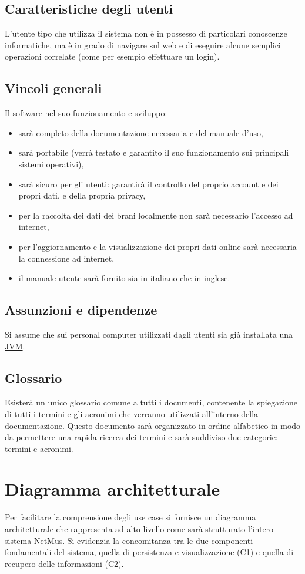 \section{Caratteristiche degli utenti}
L'utente tipo che utilizza il sistema non \`e in possesso di particolari
conoscenze informatiche, ma \`e in grado di navigare sul web e di eseguire alcune
semplici operazioni correlate (come per esempio effettuare un login).

\section{Vincoli generali}
Il software nel suo funzionamento e sviluppo:
\begin{itemize}
  \item sar\`a completo della documentazione necessaria e del manuale d'uso,
  \item sar\`a portabile (verr\`a testato e garantito il suo funzionamento sui
  principali sistemi operativi),
  \item sar\`a sicuro per gli utenti: garantir\`a il controllo del proprio account e
  dei propri dati, e della propria privacy,
  \item per la raccolta dei dati dei brani localmente non sar\`a necessario
  l'accesso ad internet,
  \item per l'aggiornamento e la visualizzazione dei propri dati online sar\`a
  necessaria la connessione ad internet,
  \item il manuale utente sar\`a fornito sia in italiano che in inglese.
\end{itemize}

\section{Assunzioni e dipendenze}
Si assume che sui personal computer utilizzati dagli utenti sia gi\`a installata
una \underline{JVM}.

\section{Glossario}
Esister\`a un unico glossario comune a tutti i documenti, contenente la
spiegazione di tutti i termini e gli acronimi che verranno utilizzati
all'interno della documentazione. Questo documento sar\`a organizzato in ordine
alfabetico in modo da permettere una rapida ricerca dei termini e sar\`a suddiviso
due categorie: termini e acronimi.

\chapter{Diagramma architetturale}
\thispagestyle{fancy}
Per facilitare la comprensione degli use case si fornisce un diagramma
architetturale che rappresenta ad alto livello come sar\`a strutturato l'intero
sistema NetMus. Si evidenzia la concomitanza tra le due componenti fondamentali
del sistema, quella di persistenza e visualizzazione (C1) e quella di
recupero delle informazioni (C2).
\vspace{1cm}

